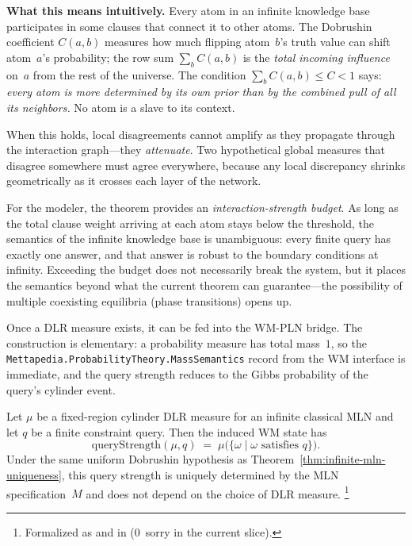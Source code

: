 \documentclass[11pt,openany]{report}
\begin{document}
\noindent
\textbf{What this means intuitively.}  Every atom in an infinite knowledge
base participates in some clauses that connect it to other atoms.  The
Dobrushin coefficient $C(a,b)$ measures how much flipping atom~$b$'s truth
value can shift atom~$a$'s probability; the row sum $\sum_b C(a,b)$ is the
\emph{total incoming influence} on~$a$ from the rest of the universe.  The
condition $\sum_b C(a,b) \le C < 1$ says: \emph{every atom is more
determined by its own prior than by the combined pull of all its neighbors.}
No atom is a slave to its context.

When this holds, local disagreements cannot amplify as they propagate through
the interaction graph---they \emph{attenuate}.  Two hypothetical global
measures that disagree somewhere must agree everywhere, because any local
discrepancy shrinks geometrically as it crosses each layer of the network.

For the modeler, the theorem provides an \emph{interaction-strength budget}.
As long as the total clause weight arriving at each atom stays below the
threshold, the semantics of the infinite knowledge base is unambiguous:
every finite query has exactly one answer, and that answer is robust to
the boundary conditions at infinity.  Exceeding the budget does not
necessarily break the system, but it places the semantics beyond what
the current theorem can guarantee---the possibility of multiple coexisting
equilibria (phase transitions) opens up.

\medskip
\noindent
Once a DLR measure exists, it can be fed into the WM-PLN bridge.  The
construction is elementary: a probability measure has total mass~$1$, so
the \texttt{Mettapedia.ProbabilityTheory.MassSemantics} record from the WM interface is immediate, and the
query strength reduces to the Gibbs probability of the query's cylinder event.

\begin{theorem}
\label{thm:infinite-mln-worldmodel}
Let $\mu$ be a fixed-region cylinder DLR measure for an infinite classical
MLN and let $q$ be a finite constraint query.  Then the induced WM state has
\[
  \mathrm{queryStrength}(\mu, q)
  \;=\; \mu\!\bigl(\{\omega \mid \omega \text{ satisfies } q\}\bigr).
\]
Under the same uniform Dobrushin hypothesis as
Theorem~\ref{thm:infinite-mln-uniqueness}, this query strength is uniquely
determined by the MLN specification~$M$ and does not depend on the choice of
DLR measure.%
\footnote{Formalized as
 and
 in
(0~sorry in the current slice).}
\end{theorem}
\end{document}
